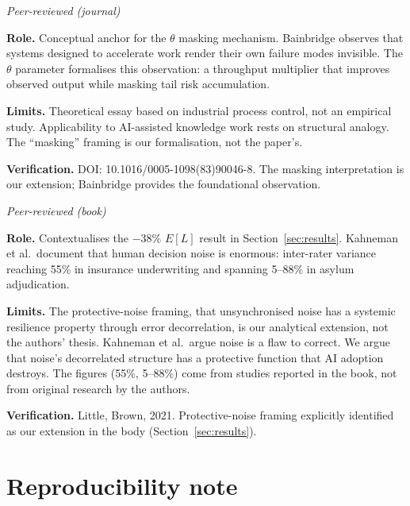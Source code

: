 \documentclass[11pt,a4paper]{article}
\begin{document}
\begin{appendices}
\begin{description}[style=nextline, leftmargin=0pt, labelindent=0pt]
\item[\cite{bainbridge_automatica_1983} --- Bainbridge (1983), Automatica.]
\hfill\textit{Peer-reviewed (journal)}

\textbf{Role.}
Conceptual anchor for the $\theta$ masking mechanism. Bainbridge observes
that systems designed to accelerate work render their own failure modes
invisible. The $\theta$ parameter formalises this observation: a throughput
multiplier that improves observed output while masking tail risk
accumulation.

\textbf{Limits.}
Theoretical essay based on industrial process control, not an empirical
study. Applicability to AI-assisted knowledge work rests on structural
analogy. The ``masking'' framing is our formalisation, not the paper's.

\textbf{Verification.}
DOI: 10.1016/0005-1098(83)90046-8. The masking interpretation is our
extension; Bainbridge provides the foundational observation.

\item[\cite{kahneman_book_2021} --- Kahneman, Sibony \& Sunstein (2021),
\textit{Noise}.]
\hfill\textit{Peer-reviewed (book)}

\textbf{Role.}
Contextualises the $-38\%$ $E[L]$ result in Section~\ref{sec:results}.
Kahneman et al.\ document that human decision noise is enormous: inter-rater
variance reaching 55\% in insurance underwriting and spanning 5--88\% in
asylum adjudication.

\textbf{Limits.}
The protective-noise framing, that unsynchronised noise has a systemic
resilience property through error decorrelation, is our analytical extension,
not the authors' thesis. Kahneman et al.\ argue noise is a flaw to correct.
We argue that noise's decorrelated structure has a protective function that
AI adoption destroys. The figures (55\%, 5--88\%) come from studies reported
in the book, not from original research by the authors.

\textbf{Verification.}
Little, Brown, 2021. Protective-noise framing explicitly identified as our
extension in the body (Section~\ref{sec:results}).

\end{description}



\section{Reproducibility note}\label{app:repro}


\end{appendices}
\end{document}
